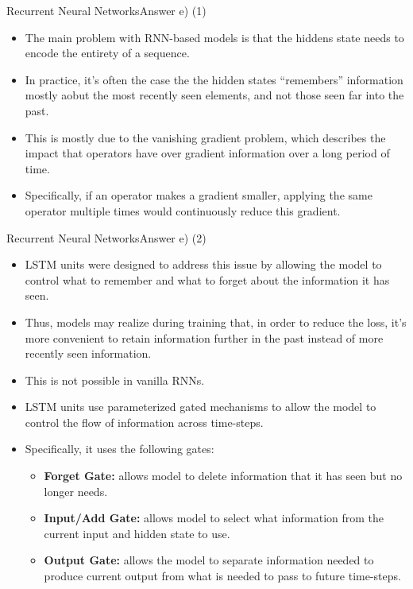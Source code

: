 \documentclass[t]{beamer}
\begin{document}
\begin{frame}{Recurrent Neural Networks}{Answer e) (1)}
    \begin{itemize}
        \item The main problem with RNN-based models is that the hiddens state
              needs to encode the entirety of a sequence.
        \item In practice, it's often the case the the hidden states
              ``remembers'' information mostly aobut the most recently seen
              elements, and not those seen far into the past.
        \item This is mostly due to the vanishing gradient problem, which
              describes the impact that operators have over gradient information
              over a long period of time.
        \item Specifically, if an operator makes a gradient smaller, applying
              the same operator multiple times would continuously reduce this
              gradient.
    \end{itemize}
\end{frame}

\begin{frame}{Recurrent Neural Networks}{Answer e) (2)}
    \begin{itemize}
        \item LSTM units were designed to address this issue by allowing the
              model to control what to remember and what to forget about the
              information it has seen.
        \item Thus, models may realize during training that, in order to
              reduce the loss, it's more convenient to retain information
              further in the past instead of more recently seen information.
        \item This is not possible in vanilla RNNs.
        \item LSTM units use parameterized gated mechanisms to allow the model
              to control the flow of information across time-steps.
        \item Specifically, it uses the following gates:
              \begin{itemize}
                  \item \textbf{Forget Gate:} allows model to delete information
                        that it has seen but no longer needs.
                  \item \textbf{Input/Add Gate:} allows model to select what
                        information from the current input and hidden state to
                        use.
                  \item \textbf{Output Gate:} allows the model to separate
                        information needed to produce current output from what
                        is needed to pass to future time-steps.
              \end{itemize}
    \end{itemize}
\end{frame}
\end{document}
